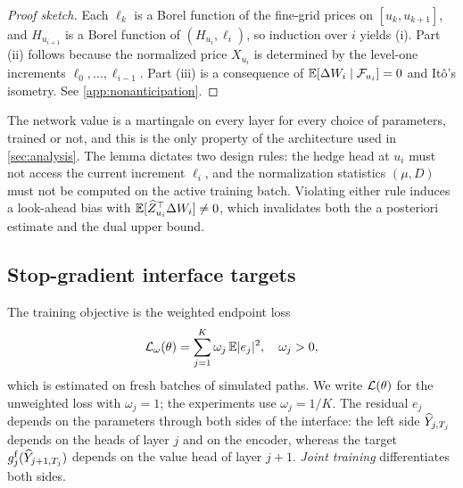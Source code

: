 \begin{proof}[Proof sketch]
Each $\ell_k$ is a Borel function of the fine-grid prices on $[u_k,u_{k+1}]$, and $H_{u_{i+1}}$ is a Borel function of $(H_{u_i},\ell_i)$, so induction over $i$ yields (i). Part (ii) follows because the normalized price $X_{u_i}$ is determined by the level-one increments $\ell_0,\dots,\ell_{i-1}$. Part (iii) is a consequence of $\mathbb{E}[\Delta W_i\mid\mathcal{F}_{u_i}]=0$ and It\^o's isometry. See \cref{app:nonanticipation}.
\end{proof}

\begin{remark}\label{rem:nonanticipation}
The network value is a martingale on every layer for every choice of parameters, trained or not, and this is the only property of the architecture used in \cref{sec:analysis}. The lemma dictates two design rules: the hedge head at $u_i$ must not access the current increment $\ell_i$, and the normalization statistics $(\mu,D)$ must not be computed on the active training batch. Violating either rule induces a look-ahead bias with $\mathbb{E}[\widehat Z_{u_i}^\top\Delta W_i]\ne0$, which invalidates both the a posteriori estimate and the dual upper bound.
\end{remark}

\subsection{Stop-gradient interface targets}\label{sec:loss}

The training objective is the weighted endpoint loss
\begin{equation}\label{eq:loss}
\mathcal{L}_\omega(\theta)=\sum_{j=1}^K\omega_j\,\mathbb{E}\lvert e_j\rvert^2,\quad \omega_j>0,
\end{equation}
which is estimated on fresh batches of simulated paths. We write $\mathcal{L}(\theta)$ for the unweighted loss with $\omega_j=1$; the experiments use $\omega_j=1/K$. The residual $e_j$ depends on the parameters through both sides of the interface: the left side $\widehat Y_{j,T_j}$ depends on the heads of layer $j$ and on the encoder, whereas the target $g^{\mathrm f}_j(\widehat Y_{j+1,T_j})$ depends on the value head of layer $j+1$. \emph{Joint training} \cite{huang2026} differentiates both sides.

